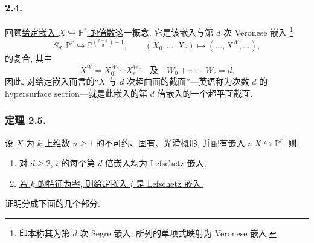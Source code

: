 \subsubsection*{2.4.}
回顾\underline{给定嵌入 $X\hookrightarrow\mathbb P^r$ 的倍数}这一概念. 它是该嵌入与第 $d$ 次 Veronese 嵌入
\footnote{印本称其为第 $d$ 次 Segre 嵌入; 所列的单项式映射为 Veronese 嵌入.}
\[
S_d:\mathbb P^r\hookrightarrow
\mathbb P^{\binom{r+d}{d}-1},
\qquad
(X_0,\ldots,X_r)\longmapsto(\ldots,X^W,\ldots),
\]
的复合, 其中
\[
X^W=X_0^{W_0}\cdots X_r^{W_r}
\quad\text{及}\quad
W_0+\cdots+W_r=d.
\]
因此, 对给定嵌入而言的“$X$ 与 $d$ 次超曲面的截面”---英语称为次数 $d$ 的 hypersurface section---就是此嵌入的第 $d$ 倍嵌入的一个超平面截面.

\subsubsection*{定理 2.5.}
\underline{设 $X$ 为 $k$ 上维数 $n\geq1$ 的不可约、固有、光滑概形, 并配有嵌入 $i:X\hookrightarrow\mathbb P^r$. 则:}
\begin{enumerate}
\item[2.5.1.] \underline{对 $d\geq2$, $i$ 的每个第 $d$ 倍嵌入均为 Lefschetz 嵌入;}
\item[2.5.2.] \underline{若 $k$ 的特征为零, 则给定嵌入 $i$ 是 Lefschetz 嵌入.}
\end{enumerate}
证明分成下面的几个部分.